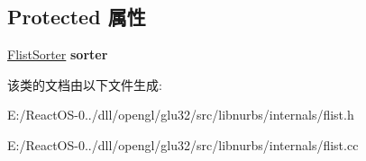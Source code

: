 \subsection*{Protected 属性}
\begin{DoxyCompactItemize}
\item 
\mbox{\label{class_flist_a43a6054bfa9857a9041f1ca6a4072b0d}} 
\hyperlink{class_flist_sorter}{Flist\+Sorter} {\bfseries sorter}
\end{DoxyCompactItemize}


该类的文档由以下文件生成\+:\begin{DoxyCompactItemize}
\item 
E\+:/\+React\+O\+S-\/0../dll/opengl/glu32/src/libnurbs/internals/flist.\+h\item 
E\+:/\+React\+O\+S-\/0../dll/opengl/glu32/src/libnurbs/internals/flist.\+cc\end{DoxyCompactItemize}
